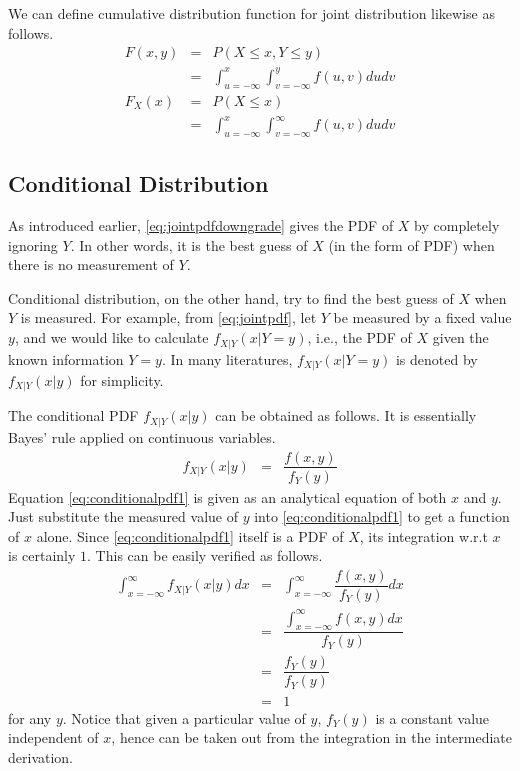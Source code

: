 We can define cumulative distribution function for joint distribution likewise as follows.
\begin{eqnarray}
  F(x, y) &=& P(X \leq x, Y \leq y) \nonumber \\
  &=& \int_{u=-\infty}^{x}\int_{v=-\infty}^{y}f(u, v)dudv \nonumber \\
  F_X(x) &=& P(X \leq x) \nonumber \\
  &=& \int_{u=-\infty}^{x}\int_{v=-\infty}^{\infty}f(u, v)dudv \nonumber
\end{eqnarray}

\subsection{Conditional Distribution}

As introduced earlier, \eqref{eq:jointpdfdowngrade} gives the PDF of $X$ by completely ignoring $Y$. In other words, it is the best guess of $X$ (in the form of PDF) when there is no measurement of $Y$.

Conditional distribution, on the other hand, try to find the best guess of $X$ when $Y$ is measured. For example, from \eqref{eq:jointpdf}, let $Y$ be measured by a fixed value $y$, and we would like to calculate $f_{X|Y}(x |Y=y)$, i.e., the PDF of $X$ given the known information $Y=y$. In many literatures, $f_{X|Y}(x |Y=y)$ is denoted by $f_{X|Y}(x|y)$ for simplicity.

The conditional PDF $f_{X|Y}(x|y)$ can be obtained as follows. It is essentially Bayes' rule applied on continuous variables.
\begin{eqnarray}
  f_{X|Y}(x|y) &=& \dfrac{f(x, y)}{f_Y(y)} \label{eq:conditionalpdf1}
\end{eqnarray}
Equation \eqref{eq:conditionalpdf1} is given as an analytical equation of both $x$ and $y$. Just substitute the measured value of $y$ into \eqref{eq:conditionalpdf1} to get a function of $x$ alone. Since \eqref{eq:conditionalpdf1} itself is a PDF of $X$, its integration w.r.t $x$ is certainly $1$. This can be easily verified as follows.
\begin{eqnarray}
  \int_{x=-\infty}^{\infty}f_{X|Y}(x|y)dx &=& \int_{x=-\infty}^{\infty}\dfrac{f(x, y)}{f_Y(y)}dx \nonumber \\
  &=& \dfrac{\int_{x=-\infty}^{\infty}f(x, y)dx}{f_Y(y)} \nonumber \\
  &=& \dfrac{f_Y(y)}{f_Y(y)} \nonumber \\
  &=& 1 \nonumber
\end{eqnarray}
for any $y$. Notice that given a particular value of $y$, $f_Y(y)$ is a constant value independent of $x$, hence can be taken out from the integration in the intermediate derivation.


